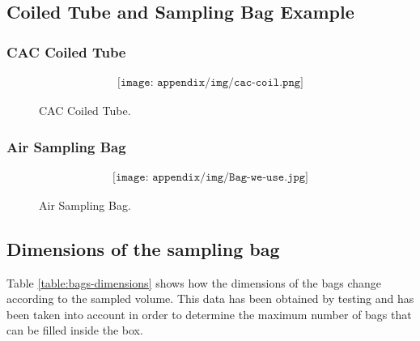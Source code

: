 
\subsection{Coiled Tube and Sampling Bag Example} \label{sec:appA}
\subsubsection{CAC Coiled Tube} \label{A}
\begin{figure}[H]
    \begin{align*}
        \texttt{[image: appendix/img/cac-coil.png]}
    \end{align*}
    \caption{CAC Coiled Tube.}
    \label{fig:A1}
\end{figure}

\subsubsection{Air Sampling Bag} \label{B}
\begin{figure}[H]
    \begin{align*}
        \texttt{[image: appendix/img/Bag-we-use.jpg]}
    \end{align*}
    \caption{Air Sampling Bag.}
    \label{fig:A2}
\end{figure}

\subsection{Dimensions of the sampling bag}
\label{dimensions-bags}

Table \ref{table:bags-dimensions} shows how the dimensions of the bags change according to the sampled volume. This data has been obtained by testing and has been taken into account in order to determine the maximum number of bags that can be filled inside the box.


